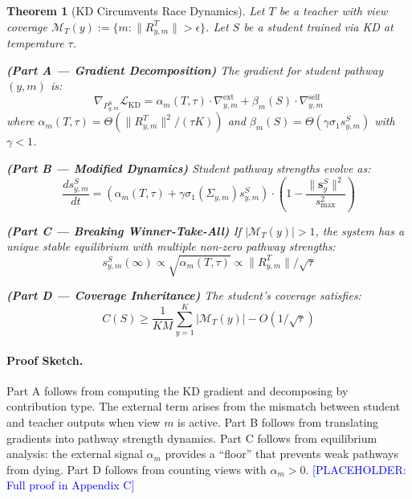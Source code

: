 \documentclass{article}
\newtheorem{theorem}{Theorem}
\newcommand{\cL}{\mathcal{L}}
\newcommand{\cM}{\mathcal{M}}
\newcommand{\placeholder}[1]{\textcolor{blue}{[PLACEHOLDER: #1]}}
\begin{document}
\begin{theorem}[KD Circumvents Race Dynamics]
\label{thm:kd}
Let $T$ be a teacher with view coverage $\cM_T(y) := \{m : \|R_{y,m}^T\| > \epsilon\}$. Let $S$ be a student trained via KD at temperature $\tau$.

\textbf{(Part A --- Gradient Decomposition)} The gradient for student pathway $(y,m)$ is:
\begin{equation}
    \nabla_{P_{y,m}^S} \cL_{\text{KD}} = \alpha_m(T, \tau) \cdot \nabla^{\text{ext}}_{y,m} + \beta_m(S) \cdot \nabla^{\text{self}}_{y,m}
\end{equation}
where $\alpha_m(T, \tau) = \Theta(\|R_{y,m}^T\|^2 / (\tau K))$ and $\beta_m(S) = \Theta(\gamma \sigma_1 s_{y,m}^S)$ with $\gamma < 1$.

\textbf{(Part B --- Modified Dynamics)} Student pathway strengths evolve as:
\begin{equation}
    \frac{ds_{y,m}^S}{dt} = \left(\alpha_m(T, \tau) + \gamma \sigma_1(\Sigma_{y,m}) s_{y,m}^S \right) \cdot \left(1 - \frac{\|\mathbf{s}_y^S\|^2}{s_{\max}^2}\right)
\end{equation}

\textbf{(Part C --- Breaking Winner-Take-All)} If $|\cM_T(y)| > 1$, the system has a unique stable equilibrium with multiple non-zero pathway strengths:
\begin{equation}
    s_{y,m}^S(\infty) \propto \sqrt{\alpha_m(T, \tau)} \propto \|R_{y,m}^T\| / \sqrt{\tau}
\end{equation}

\textbf{(Part D --- Coverage Inheritance)} The student's coverage satisfies:
\begin{equation}
    C(S) \geq \frac{1}{KM} \sum_{y=1}^K |\cM_T(y)| - O(1/\sqrt{\tau})
\end{equation}
\end{theorem}

\paragraph{Proof Sketch.} Part A follows from computing the KD gradient and decomposing by contribution type. The external term arises from the mismatch between student and teacher outputs when view $m$ is active. Part B follows from translating gradients into pathway strength dynamics. Part C follows from equilibrium analysis: the external signal $\alpha_m$ provides a ``floor'' that prevents weak pathways from dying. Part D follows from counting views with $\alpha_m > 0$. \placeholder{Full proof in Appendix C}
\end{document}
